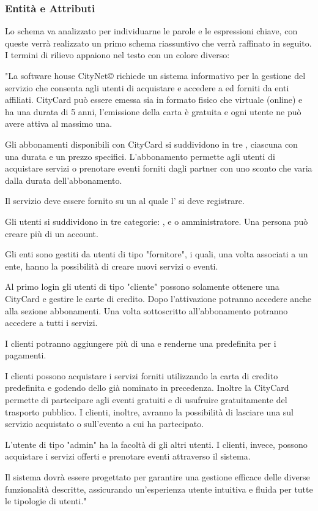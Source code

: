 \subsubsection{Entità e Attributi}
Lo schema va analizzato per individuarne le parole e le espressioni chiave, con queste verrà realizzato un primo schema riassuntivo che verrà raffinato in seguito. I termini di rilievo appaiono nel testo con un colore diverso:

\begin{adjustwidth}{}{}
"La software house CityNet© richiede un sistema informativo per la gestione del servizio  che consenta agli utenti di acquistare  e accedere a  ed  forniti da enti affiliati. CityCard può essere emessa sia in formato fisico che virtuale (online) e ha una durata di 5 anni, l'emissione della carta è gratuita e ogni utente ne può avere attiva al massimo una.

Gli abbonamenti disponibili con CityCard si suddividono in tre , ciascuna con una durata e un prezzo specifici. L'abbonamento permette agli utenti di acquistare servizi o prenotare eventi forniti dagli  partner con uno sconto che varia dalla durata dell'abbonamento.

Il servizio deve essere fornito su un  al quale l' si deve registrare.

Gli utenti si suddividono in tre categorie: ,  e  o amministratore. Una persona può creare più di un account.

Gli enti sono gestiti da utenti di tipo "fornitore", i quali, una volta associati a un ente, hanno la possibilità di creare nuovi servizi o eventi. 

Al primo login gli utenti di tipo "cliente" possono solamente ottenere una CityCard e gestire le carte di credito. Dopo l'attivazione potranno accedere anche alla sezione abbonamenti. Una volta sottoscritto all'abbonamento potranno accedere a tutti i servizi.

I clienti potranno aggiungere più di una  e renderne una predefinita per i pagamenti.

I clienti possono acquistare i servizi forniti utilizzando la carta di credito predefinita e godendo dello  già nominato in precedenza. Inoltre la CityCard permette di partecipare agli eventi gratuiti e di usufruire gratuitamente del trasporto pubblico. I clienti, inoltre, avranno la possibilità di lasciare una  sul servizio acquistato o sull'evento a cui ha partecipato.

L'utente di tipo "admin" ha la facoltà di  gli altri utenti. I clienti, invece, possono acquistare i servizi offerti e prenotare eventi attraverso il sistema.

Il sistema dovrà essere progettato per garantire una gestione efficace delle diverse funzionalità descritte, assicurando un'esperienza utente intuitiva e fluida per tutte le tipologie di utenti."
\end{adjustwidth}
